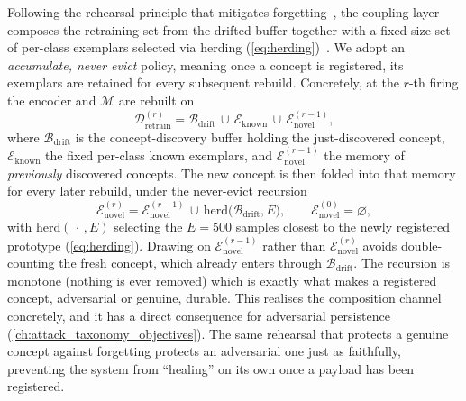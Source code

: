 Following the rehearsal principle that mitigates forgetting~\cite{Robins_1995}, the coupling layer composes the retraining set from the drifted buffer together with a fixed-size set of per-class exemplars selected via herding (\cref{eq:herding})~\cite{Rebuffi_2017}. We adopt an \emph{accumulate, never evict} policy, meaning once a concept is registered, its exemplars are retained for every subsequent rebuild. Concretely, at the $r$-th firing the encoder and $\mathcal{M}$ are rebuilt on
\begin{equation} \label{eq:retrain-set}
\mathcal{D}^{(r)}_{\mathrm{retrain}} = \mathcal{B}_{\mathrm{drift}} \,\cup\, \mathcal{E}_{\mathrm{known}} \,\cup\, \mathcal{E}^{(r-1)}_{\mathrm{novel}},
\end{equation}
where $\mathcal{B}_{\mathrm{drift}}$ is the concept-discovery buffer holding the just-discovered concept, $\mathcal{E}_{\mathrm{known}}$ the fixed per-class known exemplars, and $\mathcal{E}^{(r-1)}_{\mathrm{novel}}$ the memory of \emph{previously} discovered concepts. The new concept is then folded into that memory for every later rebuild, under the never-evict recursion
\begin{equation} \label{eq:never-evict}
\mathcal{E}^{(r)}_{\mathrm{novel}} = \mathcal{E}^{(r-1)}_{\mathrm{novel}} \,\cup\, \mathrm{herd}\big(\mathcal{B}_{\mathrm{drift}}, E\big), \qquad \mathcal{E}^{(0)}_{\mathrm{novel}} = \varnothing,
\end{equation}
with $\mathrm{herd}(\,\cdot\,, E)$ selecting the $E = 500$ samples closest to the newly registered prototype (\cref{eq:herding}). Drawing on $\mathcal{E}^{(r-1)}_{\mathrm{novel}}$ rather than $\mathcal{E}^{(r)}_{\mathrm{novel}}$ avoids double-counting the fresh concept, which already enters through $\mathcal{B}_{\mathrm{drift}}$. The recursion is monotone (nothing is ever removed) which is exactly what makes a registered concept, adversarial or genuine, durable. This realises the composition channel concretely, and it has a direct consequence for adversarial persistence (\cref{ch:attack_taxonomy_objectives}). The same rehearsal that protects a genuine concept against forgetting protects an adversarial one just as faithfully, preventing the system from ``healing'' on its own once a payload has been registered.


